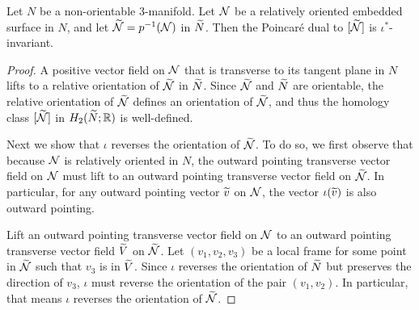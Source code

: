 \begin{lem}
  \label{lem:PD1}
 Let $N$ be a non-orientable 3-manifold.  %
  Let $\mathcal{N}$ be a relatively oriented embedded surface in $N$, and let $\widetilde{\mathcal{N}}=p^{-1}(\mathcal{N})$ in $\widetilde{N}$.
  Then the Poincar\'e dual to $[\widetilde{\mathcal{N}}]$ is $\iota^{\ast}$-invariant.%
\end{lem}
\begin{proof}
  A positive vector field on $\mathcal{N}$ that is transverse to its tangent plane in $N$ lifts to a relative orientation of $\widetilde{\mathcal{N}}$ in $\widetilde{N}$.
  Since $\widetilde{\mathcal{N}}$ and $\widetilde{N}$ are orientable, the relative orientation of $\widetilde{\mathcal{N}}$ defines an orientation of $\widetilde{\mathcal{N}}$, and thus the homology class $[\widetilde{\mathcal{N}}]$ in $H_2(\widetilde{N};\mathbb{R})$ is well-defined.

  Next we show that $\iota$ reverses the orientation of $\widetilde{\mathcal{N}}$.  To do so, we first observe that because $\mathcal{N}$ is relatively oriented in $N$, the outward pointing transverse vector field on ${\mathcal{N}}$ must lift to an outward pointing transverse vector field on $\widetilde{\mathcal{N}}$.  In particular, for any outward pointing vector $\widetilde{v}$ on $\mathcal{N}$, the vector $\iota(\widetilde{v})$ is also outward pointing.%

  Lift an outward pointing transverse vector field on $\mathcal{N}$ to an outward pointing transverse vector field $\widetilde{V}$ on $\widetilde{\mathcal{N}}$.  Let $(v_1, v_2, v_3)$ be a local frame for some point in $\widetilde{\mathcal{N}}$ such that
  $v_3$ is in $\widetilde{V}$.
  Since $\iota$ reverses the orientation of $\widetilde{N}$ but preserves the direction of $v_3$, $\iota$ must reverse the orientation of the pair $(v_1, v_2)$.
  In particular, that means $\iota$ reverses the orientation of $\widetilde{\mathcal{N}}$.


\end{proof}

